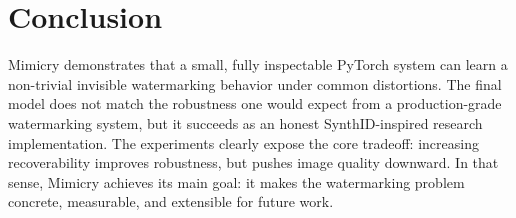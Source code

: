 \documentclass[11pt]{article}
\begin{document}
\section{Conclusion}
Mimicry demonstrates that a small, fully inspectable PyTorch system can learn a non-trivial invisible watermarking behavior under common distortions. The final model does not match the robustness one would expect from a production-grade watermarking system, but it succeeds as an honest SynthID-inspired research implementation. The experiments clearly expose the core tradeoff: increasing recoverability improves robustness, but pushes image quality downward. In that sense, Mimicry achieves its main goal: it makes the watermarking problem concrete, measurable, and extensible for future work.
\end{document}
